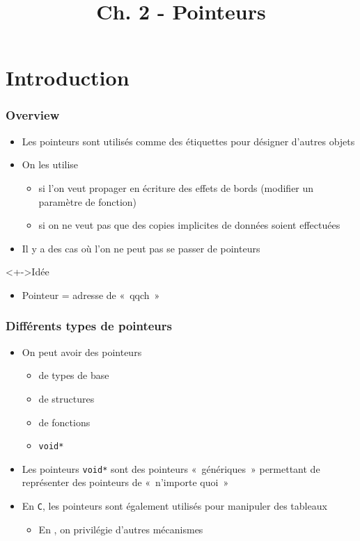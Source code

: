 


\title{Ch. 2 - Pointeurs}




\section{Introduction}

\begin{frame}
\frametitle{Overview}
\begin{itemize}[<+->]
\item Les pointeurs sont utilisés comme des étiquettes pour désigner d'autres objets
\item On les utilise 
	\begin{itemize}
	\item si l'on veut propager en écriture des effets de bords (modifier un paramètre de fonction)
	\item si on ne veut pas que des copies implicites de données soient effectuées
	\end{itemize}
\item Il y a des cas où l'on ne peut pas se passer de pointeurs
\end{itemize}
\begin{exampleblock}<+->{Idée}
	\begin{itemize}
	\item Pointeur = adresse de «~qqch~»
	\end{itemize}
\end{exampleblock}
\end{frame}

\begin{frame}
\frametitle{Différents types de pointeurs}
\begin{itemize}[<+->]
\item On peut avoir des pointeurs
	\begin{itemize}
	\item de types de base
	\item de structures
	\item de fonctions
	\item \lstinline|void*|
	\end{itemize}
\item Les pointeurs \lstinline|void*| sont des pointeurs «~génériques~» permettant de représenter des pointeurs de «~n'importe quoi~»
\item En \texttt{C}, les pointeurs sont également utilisés pour manipuler des tableaux
	\begin{itemize}
	\item En \cpp, on privilégie d'autres mécanismes
	\end{itemize}
\end{itemize}
\end{frame}


